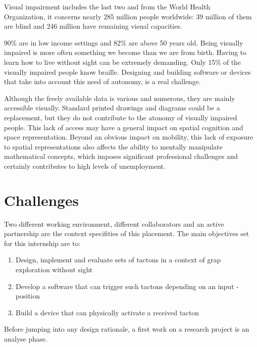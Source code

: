 Visual impairment includes the last two and from the World Health
Organization, it concerns nearly 285 million people worldwide: 39
million of them are blind and 246 million have remaining visual
capacities.

90\% are in low income settings and 82\% are above 50 years old. Being
visually impaired is more often something we become than we are from birth. Having to learn
how to live without sight can be extremely demanding. Only 15\% of the
visually impaired people know braille. Designing and building software
or devices that take into account this need of autonomy, is a real
challenge.

Although the freely available data is various and numerous, they are mainly accessible visually. Standard printed drawings and diagrams could be a replacement, but they do not contribute to the atonomy of visually impaired people. This lack of access may have a general impact on spatial cognition and space representation. Beyond an obvious impact on mobility, this lack of exposure to spatial representations also affects the ability to mentally manipulate mathematical concepts, which imposes significant professional challenges and certainly contributes to high levels of unemployment.

\section{Challenges}\label{Challenges}

Two different working environment, different collaborators and an active partnership are the context specifities of this placement. The main objectives set for this internship are to:

\begin{enumerate}
	\item Design, implement and evaluate sets of tactons in a context of grap exploration without sight
	\item Develop a software that can trigger such tactons depending on an input - position
	\item Build a device that can physically activate a received tacton
\end{enumerate}


Before jumping into any design rationale, a first work on a research project is an analyse phase.


